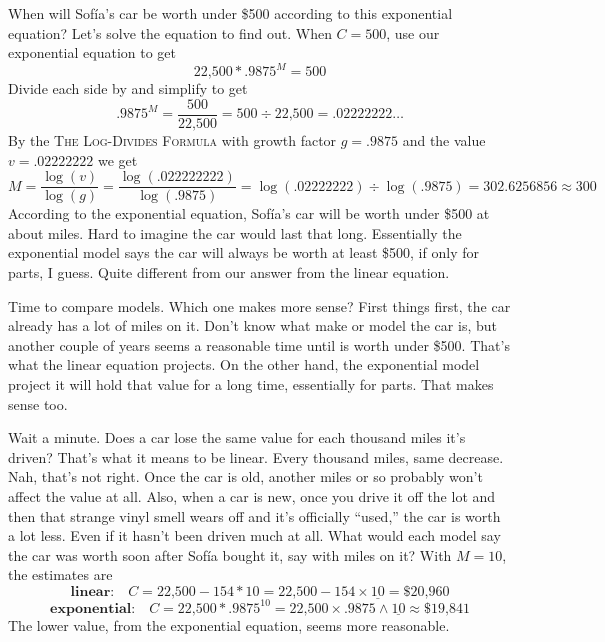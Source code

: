 When will Sof\'{i}a's car be worth under \$500 according to this exponential equation?  Let's solve the equation to find out.  When $C=500$, use our exponential equation to get  %
$$ \text{22,500} \ast .9875^M =500$$
Divide each side by  and simplify to get
$$.9875^M= \frac{500}{\text{22,500}} = 500 \div \text{22,500} = .02222222\ldots$$
By the \textsc{The Log-Divides Formula} with growth factor $g=.9875$ and the value $v= .02222222$ we get 
$$M =  \frac{\log (v)}{\log(g)}=  \frac{\log (.022222222)}{\log(.9875)} =  \log (.02222222) \div \log (.9875) = 302.6256856 \approx 300$$
According to the exponential equation, Sof\'{i}a's car will be worth under \$500 at about  miles.  Hard to imagine the car would last that long.  Essentially the exponential model says the car will always be worth at least \$500, if only for parts, I guess.  Quite different from our answer from the linear equation.

Time to compare models.  Which one makes more sense?  First things first, the car already has a lot of miles on it.  Don't know what make or model the car is, but another couple of years seems a reasonable time until is worth under \$500.  That's what the linear  equation projects.  On the other hand, the exponential model project it will hold that value for a long time, essentially for parts.  That makes sense too.

Wait a minute.  Does a car lose the same value for each thousand miles it's driven?  That's what it means to be linear. Every thousand miles, same decrease.  Nah, that's not right.  Once the car is old, another  miles or so probably won't affect the value at all. Also, when a car is new, once you drive it off the lot and then that strange vinyl smell wears off and it's officially ``used,'' the car is worth a lot less.  Even if it hasn't been driven much at all. What would each model say the car was worth soon after Sof\'{i}a bought it, say with  miles on it? With $M=10$, the estimates are
 $$\textbf{linear:} \quad C =  \text{22,500} - 154 \ast 10 = \text{22,500} - 154 \times \underline{10} = \$\text{20,960}$$ 
$$\textbf{exponential:} \quad C=  \text{22,500} \ast .9875^{10}=  \text{22,500} \times .9875 \wedge\underline{10}
 \approx \$\text{19,841}$$
The lower value, from the exponential equation, seems more reasonable.

